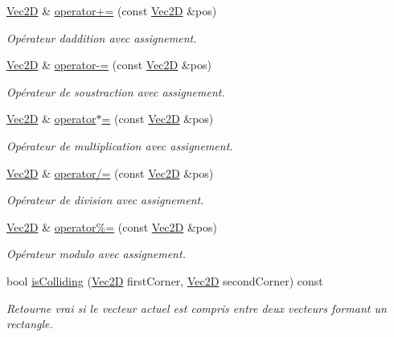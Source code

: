 \begin{DoxyCompactItemize}
\hyperlink{classns_graphics_1_1_vec2_d}{Vec2D} \& \hyperlink{classns_graphics_1_1_vec2_d_aafd8b68f1cb9dcfcf92a96714e58c5ec}{operator+=} (const \hyperlink{classns_graphics_1_1_vec2_d}{Vec2D} \&pos)
\begin{DoxyCompactList}\small\item\em Opérateur d\textquotesingle{}addition avec assignement. \end{DoxyCompactList}\item 
\hyperlink{classns_graphics_1_1_vec2_d}{Vec2D} \& \hyperlink{classns_graphics_1_1_vec2_d_aa9b0986206c35bb5c0043db02548fce4}{operator-\/=} (const \hyperlink{classns_graphics_1_1_vec2_d}{Vec2D} \&pos)
\begin{DoxyCompactList}\small\item\em Opérateur de soustraction avec assignement. \end{DoxyCompactList}\item 
\hyperlink{classns_graphics_1_1_vec2_d}{Vec2D} \& \hyperlink{classns_graphics_1_1_vec2_d_a6e0e661361c0f3081fa2d9488978771e}{operator$\ast$=} (const \hyperlink{classns_graphics_1_1_vec2_d}{Vec2D} \&pos)
\begin{DoxyCompactList}\small\item\em Opérateur de multiplication avec assignement. \end{DoxyCompactList}\item 
\hyperlink{classns_graphics_1_1_vec2_d}{Vec2D} \& \hyperlink{classns_graphics_1_1_vec2_d_a1146ac9d05c667bb4a46140858953711}{operator/=} (const \hyperlink{classns_graphics_1_1_vec2_d}{Vec2D} \&pos)
\begin{DoxyCompactList}\small\item\em Opérateur de division avec assignement. \end{DoxyCompactList}\item 
\hyperlink{classns_graphics_1_1_vec2_d}{Vec2D} \& \hyperlink{classns_graphics_1_1_vec2_d_a57003f3d4660f986c3c21c027ac8b154}{operator\%=} (const \hyperlink{classns_graphics_1_1_vec2_d}{Vec2D} \&pos)
\begin{DoxyCompactList}\small\item\em Opérateur modulo avec assignement. \end{DoxyCompactList}\item 
bool \hyperlink{classns_graphics_1_1_vec2_d_aa02cee45c2d8aa2d9b7e08dfb6c1dfca}{is\+Colliding} (\hyperlink{classns_graphics_1_1_vec2_d}{Vec2D} first\+Corner, \hyperlink{classns_graphics_1_1_vec2_d}{Vec2D} second\+Corner) const
\begin{DoxyCompactList}\small\item\em Retourne vrai si le vecteur actuel est compris entre deux vecteurs formant un rectangle. \end{DoxyCompactList}\item 

\end{DoxyCompactItemize}
